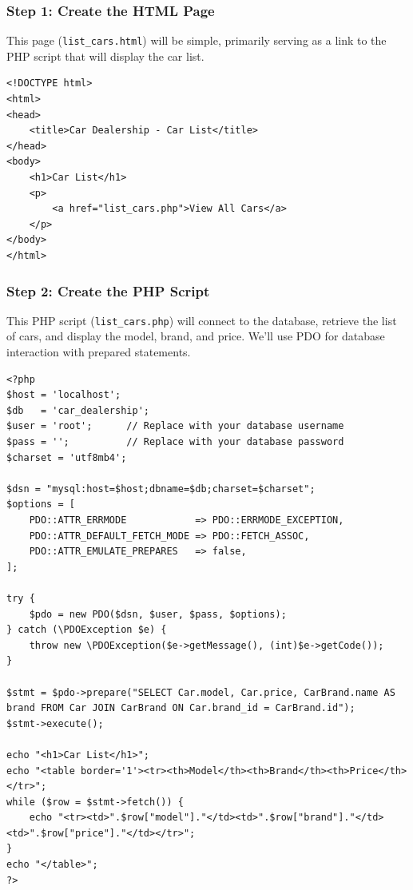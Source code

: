 \documentclass[11pt]{article}
\begin{document}
\subsubsection{Step 1: Create the HTML Page}
\label{sec:org99f0a8a}
This page (\texttt{list\_cars.html}) will be simple, primarily serving as a link
to the PHP script that will display the car list.

\begin{verbatim}
<!DOCTYPE html>
<html>
<head>
    <title>Car Dealership - Car List</title>
</head>
<body>
    <h1>Car List</h1>
    <p>
        <a href="list_cars.php">View All Cars</a>
    </p>
</body>
</html>
\end{verbatim}

\subsubsection{Step 2: Create the PHP Script}
\label{sec:org36f5a87}
This PHP script (\texttt{list\_cars.php}) will connect to the database, retrieve
the list of cars, and display the model, brand, and price. We'll use PDO
for database interaction with prepared statements.

\begin{verbatim}
<?php
$host = 'localhost';
$db   = 'car_dealership';
$user = 'root';      // Replace with your database username
$pass = '';          // Replace with your database password
$charset = 'utf8mb4';

$dsn = "mysql:host=$host;dbname=$db;charset=$charset";
$options = [
    PDO::ATTR_ERRMODE            => PDO::ERRMODE_EXCEPTION,
    PDO::ATTR_DEFAULT_FETCH_MODE => PDO::FETCH_ASSOC,
    PDO::ATTR_EMULATE_PREPARES   => false,
];

try {
    $pdo = new PDO($dsn, $user, $pass, $options);
} catch (\PDOException $e) {
    throw new \PDOException($e->getMessage(), (int)$e->getCode());
}

$stmt = $pdo->prepare("SELECT Car.model, Car.price, CarBrand.name AS brand FROM Car JOIN CarBrand ON Car.brand_id = CarBrand.id");
$stmt->execute();

echo "<h1>Car List</h1>";
echo "<table border='1'><tr><th>Model</th><th>Brand</th><th>Price</th></tr>";
while ($row = $stmt->fetch()) {
    echo "<tr><td>".$row["model"]."</td><td>".$row["brand"]."</td><td>".$row["price"]."</td></tr>";
}
echo "</table>";
?>
\end{verbatim}
\end{document}
